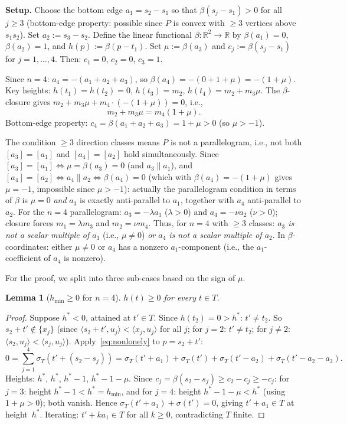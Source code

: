 \documentclass{article}
\newtheorem{lemma}{Lemma}
\begin{document}
\medskip
\noindent\textbf{Setup.}
Choose the bottom edge $a_1=s_2-s_1$ so that $\beta(s_j-s_1)>0$ for all $j\ge 3$
(bottom-edge property: possible since $P$ is convex with $\ge 3$ vertices above $s_1s_2$).
Set $a_2:=s_3-s_2$.
Define the linear functional $\beta:\mathbb{R}^2\to\mathbb{R}$ by $\beta(a_1)=0$, $\beta(a_2)=1$,
and $h(p):=\beta(p-t_1)$.
Set $\mu:=\beta(a_3)$ and $c_j:=\beta(s_j-s_1)$ for $j=1,\dots,4$.
Then: $c_1=0$, $c_2=0$, $c_3=1$.

Since $n=4$: $a_4=-(a_1+a_2+a_3)$, so $\beta(a_4)=-(0+1+\mu)=-(1+\mu)$.
Key heights: $h(t_1)=h(t_2)=0$, $h(t_3)=m_2$, $h(t_4)=m_2+m_3\mu$.
The $\beta$-closure gives $m_2+m_3\mu+m_4\cdot(-(1+\mu))=0$, i.e.,
\begin{equation}\label{eq:closure4}
  m_2+m_3\mu = m_4(1+\mu).
\end{equation}
Bottom-edge property: $c_4=\beta(a_1+a_2+a_3)=1+\mu>0$ (so $\mu>-1$).

The condition $\ge 3$ direction classes means $P$ is not a parallelogram, i.e.,
not both $[a_3]=[a_1]$ and $[a_4]=[a_2]$ hold simultaneously.
Since $[a_3]=[a_1]\Leftrightarrow\mu=\beta(a_3)=0$ (and $a_3\parallel a_1$),
and $[a_4]=[a_2]\Leftrightarrow a_4\parallel a_2\Leftrightarrow\beta(a_4)=0$ (which with $\beta(a_4)=-(1+\mu)$ gives $\mu=-1$, impossible since $\mu>-1$):
actually the parallelogram condition in terms of $\beta$ is $\mu=0$ \emph{and}
$a_3$ is exactly anti-parallel to $a_1$, together with $a_4$ anti-parallel to $a_2$.
For the $n=4$ parallelogram: $a_3=-\lambda a_1$ ($\lambda>0$) and $a_4=-\nu a_2$ ($\nu>0$);
closure forces $m_1=\lambda m_3$ and $m_2=\nu m_4$.
Thus, for $n=4$ with $\ge 3$ classes: \emph{$a_3$ is not a scalar multiple of $a_1$}
(i.e., $\mu\ne 0$) \emph{or $a_4$ is not a scalar multiple of $a_2$}.
In $\beta$-coordinates: either $\mu\ne 0$ or $a_4$ has a nonzero $a_1$-component
(i.e., the $a_1$-coefficient of $a_4$ is nonzero).

For the proof, we split into three sub-cases based on the sign of $\mu$.

\begin{lemma}[$h_{\min}\ge 0$ for $n=4$]\label{lem:betamin4}
$h(t)\ge 0$ for every $t\in T$.
\end{lemma}
\begin{proof}
Suppose $h^*<0$, attained at $t'\in T$.  Since $h(t_2)=0>h^*$: $t'\ne t_2$.
So $s_2+t'\notin\{x_j\}$ (since $\langle s_2+t',u_j\rangle<\langle x_j,u_j\rangle$ for all $j$;
for $j=2$: $t'\ne t_2$; for $j\ne 2$: $\langle s_2,u_j\rangle<\langle s_j,u_j\rangle$).
Apply~\eqref{eq:nonlonely} to $p=s_2+t'$:
\[
  0=\sum_{j=1}^4\sigma_T(t'+(s_2-s_j))
  =\sigma_T(t'+a_1)+\sigma_T(t')+\sigma_T(t'-a_2)+\sigma_T(t'-a_2-a_3).
\]
Heights: $h^*$, $h^*$, $h^*-1$, $h^*-1-\mu$.
Since $c_j=\beta(s_2-s_j)\ge c_2-c_j\ge-c_j$: for $j=3$: height $h^*-1<h^*=h_{\min}$,
and for $j=4$: height $h^*-1-\mu<h^*$ (using $1+\mu>0$); both vanish.
Hence $\sigma_T(t'+a_1)+\sigma(t')=0$, giving $t'+a_1\in T$ at height~$h^*$.
Iterating: $t'+ka_1\in T$ for all $k\ge 0$, contradicting $T$ finite.
\end{proof}
\end{document}
